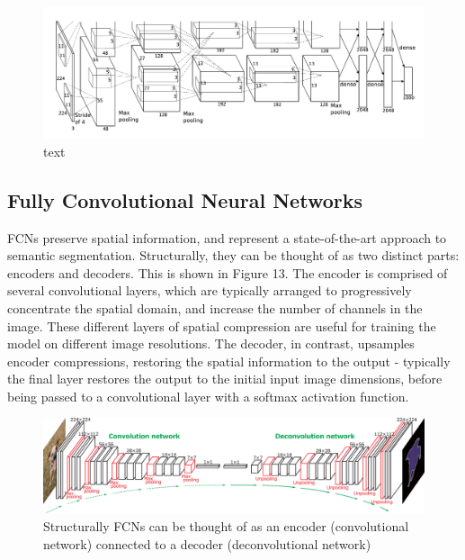 \documentclass[a4paper]{article}
\begin{document}
\begin{figure}[h]
\centering
\includegraphics[scale=0.25]{alexnet}
\caption{text}
\end{figure}

\clearpage

\subsection{Fully Convolutional Neural Networks}
FCNs preserve spatial information, and represent a state-of-the-art approach to semantic segmentation. Structurally, they can be thought of as two distinct parts: encoders and decoders. This is shown in Figure 13. The encoder is comprised of several convolutional layers, which are typically arranged to progressively concentrate the spatial domain, and increase the number of channels in the image. These different layers of spatial compression are useful for training the model on different image resolutions. The decoder, in contrast, upsamples encoder compressions, restoring the spatial information to the output - typically the final layer restores the output to the initial input image dimensions, before being passed to a convolutional layer with a softmax activation function.
\vspace{0.25cm}
\begin{figure}[h]
\centering
\includegraphics[scale=0.25]{FCN}
\caption{Structurally FCNs can be thought of as an encoder (convolutional network) connected to a decoder (deconvolutional network)}
\end{figure}
\end{document}
